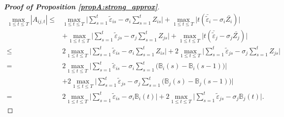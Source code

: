 \begin{proof}[\textnormal{\textbf{Proof of Proposition \ref{propA:strong_approx}}}]
\begin{align*}
\max_{1 \le t \le T} |A_{ij, t}|   \le & \max_{1 \le t \le T} \Big| \sum\limits_{s=1}^t \widetilde{\varepsilon}_{is} -{\sigma}_i \sum\limits_{s=1}^t Z_{is} \Big| + \max_{1 \le t \le T} \Big| t (\bar{\widetilde{\varepsilon}}_{i} - {\sigma}_i \bar{Z_i}) \Big|\\
& + \max_{1 \le t \le T} \Big| \sum\limits_{s=1}^t \widetilde{\varepsilon}_{js} - {\sigma}_j \sum\limits_{s=1}^t Z_{js} \Big| + \max_{1 \le t \le T} \Big| t (\bar{\widetilde{\varepsilon}}_{j} -{\sigma}_j \bar{Z_j}) \Big| \\
\le & 2 \max_{1 \le t \le T} \Big| \sum\limits_{s=1}^t \widetilde{\varepsilon}_{is} -{\sigma}_i \sum\limits_{s=1}^t Z_{is} \Big| + 2 \max_{1 \le t \le T} \Big| \sum\limits_{s=1}^t \widetilde{\varepsilon}_{js} -{\sigma}_j \sum\limits_{s=1}^t Z_{js} \Big| \\
= & 2 \max_{1 \le t \le T} \Big| \sum\limits_{s=1}^t \widetilde{\varepsilon}_{is} - {\sigma}_i \sum\limits_{s=1}^t \big(\mathbb{B}_{i}(s) - \mathbb{B}_{i}(s-1) \big) \Big| \\
& +  2 \max_{1 \le t \le T} \Big| \sum\limits_{s=1}^t \widetilde{\varepsilon}_{js} -{\sigma}_j \sum\limits_{s=1}^t \big(\mathbb{B}_{j}(s) - \mathbb{B}_{j}(s-1) \big) \Big|\\
= & 2 \max_{1 \le t \le T} \Big| \sum\limits_{s=1}^t \widetilde{\varepsilon}_{is} - {\sigma}_i \mathbb{B}_{i}(t) \Big| + 2 \max_{1 \le t \le T} \Big| \sum\limits_{s=1}^t \widetilde{\varepsilon}_{js} - {\sigma}_j \mathbb{B}_{j}(t) \Big|.
\end{align*}


\end{proof}
